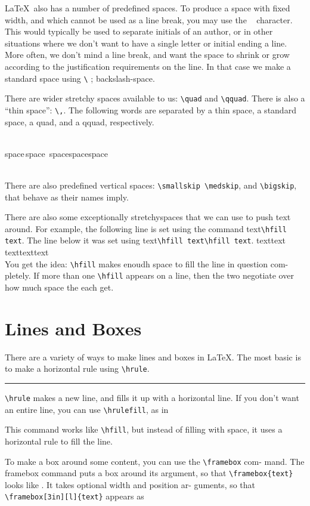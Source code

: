 \documentclass[12pt]{article}
\begin{document}
	
	\LaTeX \ also has a number of predefined spaces. To produce a space with
	fixed width, and which cannot be used as a line break, you may use the ~
	character. This would typically be used to separate initials of an author,
	or in other situations where we don’t want to have a single letter or initial
	ending a line. More often, we don’t mind a line break, and want the space
	to shrink or grow according to the justification requirements on the line. In
	that case we make a standard space using \verb|\| ; backslash-space.
	
	
	There are wider stretchy spaces available to us: \verb|\quad| and \verb|\qquad|. There
	is also a “thin space”: \verb|\,|. The following words are separated by a thin space,
	a standard space, a quad, and a qquad, respectively.\\\\
	\centerline{space\,space\ space\quad space\qquad space} \\
	
	
	There are also predefined vertical spaces: \verb|\smallskip \medskip|, and
	\verb|\bigskip|, that behave as their names imply.
	
	There are also some exceptionally stretchyspaces that we can use to
	push text around. For example, the following line is set using the command
	text\verb|\hfill text|. The line below it was set using text\verb|\hfill text\hfill text|.
	text\hfill text\\
	text\hfill text\hfill text\\
	You get the idea: \verb|\hfill| makes enoudh space to fill the line in question com-
	pletely. If more than one \verb|\hfill| appears on a line, then the two negotiate over how much space the each get.
	
	\section{Lines and Boxes}
	There are a variety of ways to make lines and boxes in \LaTeX. The most
	basic is to make a horizontal rule using \verb|\hrule|.\hrule
	
	
	\verb|\hrule| makes a new line, and fills it up with a horizontal line. If you
	don’t want an entire line, you can use \verb|\hrulefill|, as in \hrulefill
	
	
	This command works like \verb|\hfill|, but instead of filling with space, it uses a
	horizontal rule to fill the line.
	
	
	To make a box around some content, you can use the \verb|\framebox| com-
	mand. The framebox command puts a box around its argument, so that
	\verb|\framebox{text}| looks like . It takes optional width and position ar-
	guments, so that \verb|\framebox[3in][l]{text}| appears as\\
	
\end{document}
